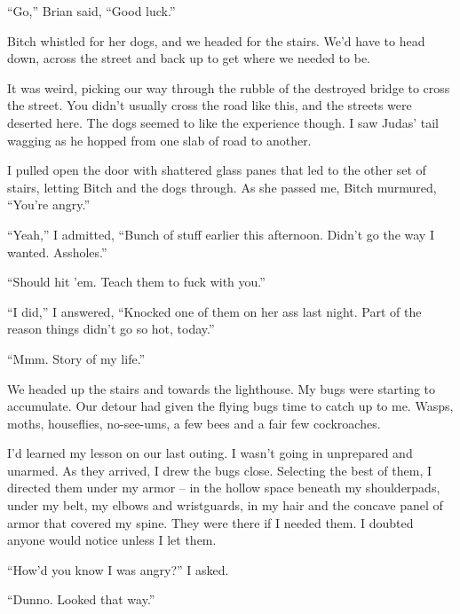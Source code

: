 ``Go,'' Brian said, ``Good luck.''



Bitch whistled for her dogs, and we headed for the stairs.  We'd have to head down, across the street and back up to get where we needed to be.



It was weird, picking our way through the rubble of the destroyed bridge to cross the street.  You didn't usually cross the road like this, and the streets were deserted here.   The dogs seemed to like the experience though.  I saw Judas' tail wagging as he hopped from one slab of road to another.



I pulled open the door with shattered glass panes that led to the other set of stairs, letting Bitch and the dogs through.  As she passed me, Bitch murmured, ``You're angry.''



``Yeah,'' I admitted, ``Bunch of stuff earlier this afternoon.  Didn't go the way I wanted.  Assholes.''



``Should hit 'em.  Teach them to fuck with you.''



``I did,'' I answered, ``Knocked one of them on her ass last night.  Part of the reason things didn't go so hot, today.''



``Mmm.  Story of my life.''



We headed up the stairs and towards the lighthouse.  My bugs were starting to accumulate.  Our detour had given the flying bugs time to catch up to me.  Wasps, moths, houseflies, no-see-ums, a few bees and a fair few cockroaches.



I'd learned my lesson on our last outing.  I wasn't going in unprepared and unarmed.  As they arrived, I drew the bugs close.  Selecting the best of them, I directed them under my armor – in the hollow space beneath my shoulderpads, under my belt, my elbows and wristguards, in my hair and the concave panel of armor that covered my spine.  They were there if I needed them.  I doubted anyone would notice unless I let them.



``How'd you know I was angry?'' I asked.



``Dunno.  Looked that way.''



